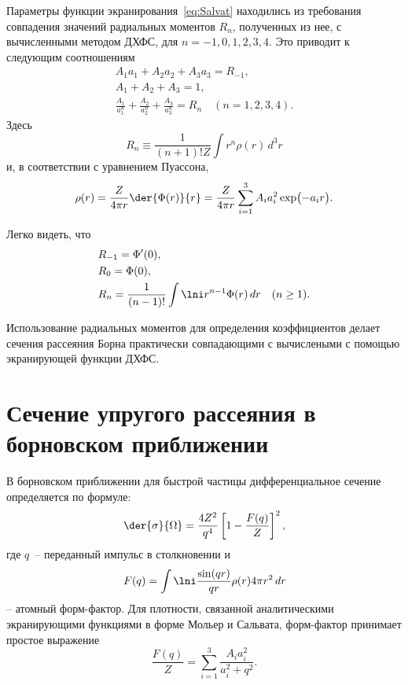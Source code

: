 \documentclass[10pt,pscyr]{hedlab}
\newcommand{\eq}  [1]{\eqref{eq:#1}}
\begin{document}
  Параметры функции экранирования~\eq{Salvat} находились из
  требования совпадения значений радиальных моментов \( R_n \),
  полученных из нее, с вычисленными методом ДХФС, для
  \( n = -1, 0, 1, 2, 3, 4 \). Это приводит к следующим соотношениям
  \begin{gather}
    A_1 a_1 + A_2 a_2 + A_3 a_3 = R_{-1}, \nonumber \\
    A_1 + A_2 + A_3 = 1, \label{eq:Salvat15} \\
    \frac{A_1}{a_1^n} + \frac{A_2}{a_2^n} + \frac{A_3}{a_3^n} =
      R_n \quad (n = 1,2,3,4). \nonumber
  \end{gather}
  Здесь
  \[
    R_n \equiv \frac{1}{(n + 1)!Z}\int r^n \rho(r)\,d^3r
  \]
  и, в соответствии с уравнением Пуассона,
  \begin{equation}
    \rho(r) = \frac{Z}{4\pi r} \der{\Phi(r)}{r} = \frac{Z}{4\pi r}
      \sum\limits_{i = 1}^3 A_i a_i^2 \exp\bigl(-a_ir\big).
    \label{eq:Poisson} 
  \end{equation}

  Легко видеть, что
  \begin{align*}
    & R_{-1} = \Phi'(0), \\
    & R_0 = \Phi (0), \\
    & R_n = \frac{1}{(n - 1)!} \int\lni r^{n - 1} \Phi(r)\,dr \quad (n \geq 1).
  \end{align*}

  Использование радиальных моментов для определения коэффициентов
  делает сечения рассеяния Борна практически совпадающими с
  вычислеными с помощью экранирующей функции ДХФС. 

  \section{Сечение упругого рассеяния в борновском приближении}

  В борновском приближении для быстрой частицы дифференциальное
  сечение определяется по формуле:
  \begin{equation}
    \der{\sigma}{\Omega} = \frac{4Z^2}{q^4}
      \left[ 1 - \frac{F(q)}{Z} \right]^2,
    \label{eq:diff} 
  \end{equation}
  где \( q \)~-- переданный импульс в столкновении и 
  \[
    F(q) = \int\lni \frac{\sin(qr)}{qr} \rho(r) 4\pi r^2\,dr
  \]
  -- атомный форм-фактор. Для плотности, связанной аналитическими
  экранирующими функциями в форме Мольер и Сальвата, форм-фактор
  принимает простое выражение
  \begin{equation}
    \frac{F(q)}{Z} = \sum_{i=1}^3 \frac{A_ia_i^2}{a_i^2 + q^2}.
    \label{eq:factor} 
  \end{equation}
\end{document}
